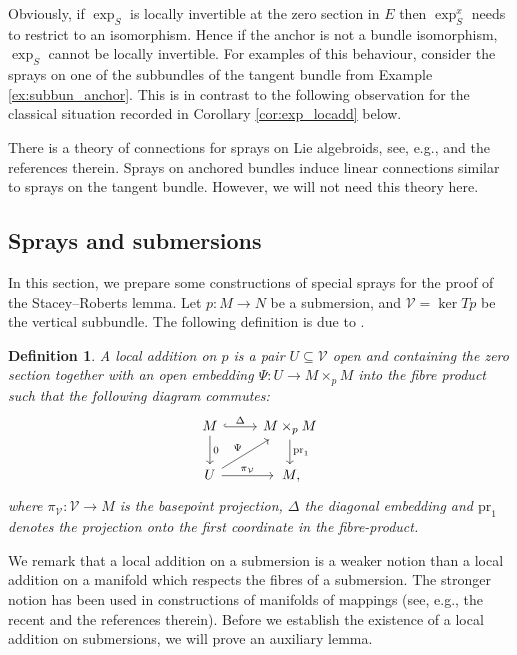 \documentclass[11pt]{article}
\numberwithin{equation}{section}
\numberwithin{equation}{section}
\newtheorem{Definition}[Theorem]{Definition}
\newcommand{\cV}{\ensuremath{\mathcal{V}}}
\begin{document}
 Obviously, if $\exp_S$ is locally invertible at the zero section in $E$ then $\exp_S^x$ needs to restrict to an isomorphism.
 Hence if the anchor is not a bundle isomorphism, $\exp_S$ cannot be locally invertible.
 For examples of this behaviour, consider the sprays on one of the subbundles of the tangent bundle from Example \ref{ex:subbun_anchor}.
 This is in contrast to the following observation for the classical situation recorded in Corollary \ref{cor:exp_locadd} below.

There is a theory of connections for sprays on Lie algebroids, see, e.g., \cite{CaF03} and the references therein. Sprays on anchored bundles induce linear connections similar to sprays on the tangent bundle. However, we will not need this theory here.

\subsection{Sprays and submersions}
In this section, we prepare some constructions of special sprays for the proof of the Stacey--Roberts lemma.
Let $p\colon M \rightarrow N$ be a submersion, and $\cV = \ker Tp$ be the vertical subbundle.
The following definition is due to \cite[Definition 3.2.15]{ste24}.

\begin{Definition}
A \emph{local addition on $p$} is a pair $U \subseteq \cV$ open and containing the zero section together with an open embedding $\Psi \colon U \rightarrow M \times_p M$ into the fibre product such that the following diagram commutes:
\begin{equation}\label{diag:loc_add_on_sub}
\begin{tikzcd}
M \arrow[r,hook,"\Delta"] \arrow[d,"0"]& M \times_p M \arrow[d,"\text{pr}_1"] \\
U \arrow[ru,"\Psi"] \arrow[r,"\pi_{\cV}"] & \,M,
\end{tikzcd}
\end{equation}
where $\pi_{\cV} \colon \cV \rightarrow M$ is the basepoint projection, $\Delta$ the diagonal embedding and $\text{pr}_1$ denotes the projection onto the first coordinate in the fibre-product.
\end{Definition}

We remark that a local addition on a submersion is a weaker notion than a local addition on a manifold which respects the fibres of a submersion. The stronger notion has been used in constructions of manifolds of mappings (see, e.g., the recent \cite[Section~5.9]{Mic20} and the references therein). Before we establish the existence of a local addition on submersions, we will prove an auxiliary lemma.
\end{document}
